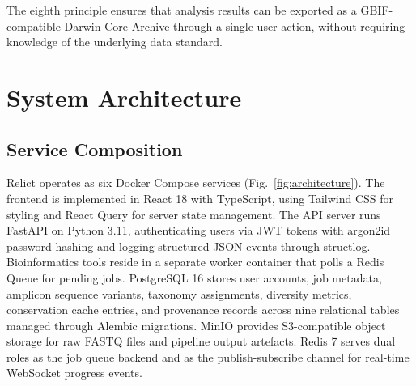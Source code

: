 \documentclass[runningheads]{llncs}
\begin{document}
The eighth principle ensures that analysis results can be exported as a GBIF-compatible Darwin Core Archive through a single user action, without requiring knowledge of the underlying data standard.

\section{System Architecture}

\subsection{Service Composition}

Relict operates as six Docker Compose services (Fig.~\ref{fig:architecture}). The frontend is implemented in React 18 with TypeScript, using Tailwind CSS for styling and React Query for server state management. The API server runs FastAPI on Python 3.11, authenticating users via JWT tokens with argon2id password hashing and logging structured JSON events through structlog. Bioinformatics tools reside in a separate worker container that polls a Redis Queue for pending jobs. PostgreSQL 16 stores user accounts, job metadata, amplicon sequence variants, taxonomy assignments, diversity metrics, conservation cache entries, and provenance records across nine relational tables managed through Alembic migrations. MinIO provides S3-compatible object storage for raw FASTQ files and pipeline output artefacts. Redis 7 serves dual roles as the job queue backend and as the publish-subscribe channel for real-time WebSocket progress events.
\end{document}
